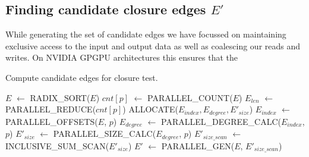 \documentclass[conference]{IEEEtran}
\begin{document}
\subsection{Finding candidate closure edges $E'$}
While generating the set of candidate edges we have focussed on maintaining exclusive access to the input and output data as well as coalescing our reads and writes. On NVIDIA GPGPU architectures this ensures that the 
\begin{algorithm}
  \caption{Compute candidate edges for closure test.}
  \begin{algorithmic}[1]
    \Statex
      \State $E$ $\gets$ RADIX\_SORT($E$) 
      \State $cnt[p]$ $\gets$ PARALLEL\_COUNT($E$) 
      \State $E_{len}$ $\gets$ PARALLEL\_REDUCE($cnt[p]$)
      \State ALLOCATE($E_{index}, E_{degree}, E'_{size}$) 
      \State $E_{index}$ $\gets$ PARALLEL\_OFFSETS($E$, $p$)
      \State $E_{degree}$ $\gets$ PARALLEL\_DEGREE\_CALC($E_{index}$, $p$)
      \State $E'_{size}$ $\gets$ PARALLEL\_SIZE\_CALC($E_{degree}$, $p$)
      \State $E'_{size\_scan}$ $\gets$ INCLUSIVE\_SUM\_SCAN($E'_{size}$)
      \State $E'$ $\gets$ PARALLEL\_GEN($E$, $E'_{size\_scan}$)
      \State {}
    \EndFunction
  \end{algorithmic}
\end{algorithm}



\end{document}
